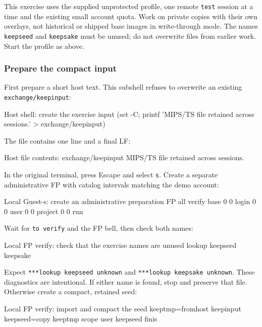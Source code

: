 This exercise uses the supplied unprotected profile, one remote \texttt{test}
session at a time and the existing small account quota. Work on private copies
with their own overlays, not historical or shipped base images in write-through
mode. The names \texttt{keepseed} and \texttt{keepsake} must be unused; do not
overwrite files from earlier work. Start the profile as above.

\subsubsection{Prepare the compact input}

First prepare a short host text. This subshell refuses to overwrite an existing
\texttt{exchange/keepinput}:

\begin{commandexample}[language=sh]{Host shell: create the exercise input}
(set -C; printf 'MIPS/TS file retained across sessions.\n' > exchange/keepinput)
\end{commandexample}

The file contains one line and a final LF:

\begin{commandexample}{Host file contents: exchange/keepinput}
MIPS/TS file retained across sessions.
\end{commandexample}

In the original terminal, press Escape and select \texttt{s}. Create a separate
administrative FP with catalog intervals matching the demo account:

\begin{commandexample}{Local Guest-s: create an administrative preparation FP}
all verify base 0 0 login 0 0 user 0 0 project 0 0 run
\end{commandexample}

Wait for \texttt{to verify} and the FP bell, then check both names:

\begin{commandexample}{Local FP verify: check that the exercise names are unused}
lookup keepseed keepsake
\end{commandexample}

Expect \texttt{***lookup keepseed unknown} and
\texttt{***lookup keepsake unknown}. These diagnostics are intentional.
If either name is found, stop and preserve that file. Otherwise create a compact,
retained seed:

\begin{commandexample}{Local FP verify: import and compact the seed}
keeptmp=fromhost keepinput
keepseed=copy keeptmp
scope user keepseed
finis
\end{commandexample}

